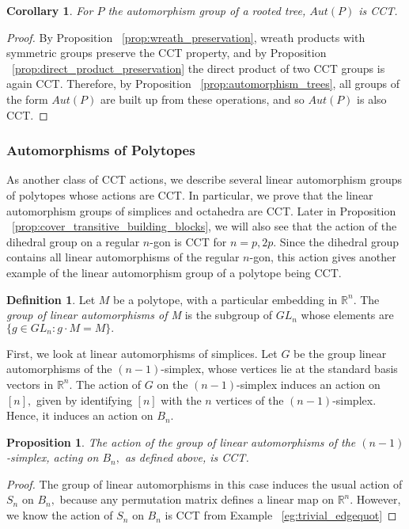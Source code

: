 \documentclass[10 pt]{amsart}
\theoremstyle{plain}
\newtheorem{prop}[thm]{Proposition}
\newtheorem{cor}[thm]{Corollary}
\theoremstyle{definition}
\newtheorem{defn}[thm]{Definition}
\theoremstyle{remark}
\numberwithin{equation}{section}
\newcommand\sssec{\subsubsection}
\begin{document}
\begin{cor}
\label{cor:tree_cct}
For $P$ the automorphism group of a rooted tree, $Aut(P)$ is CCT.
\end{cor}
\begin{proof}
By Proposition ~\ref{prop:wreath_preservation}, wreath products with symmetric groups preserve the CCT property, and by Proposition ~\ref{prop:direct_product_preservation} the direct product of two CCT groups is again CCT. Therefore, by Proposition ~\ref{prop:automorphism_trees}, all groups of the form $Aut(P)$ are built up from these operations, and so $Aut(P)$ is also CCT.
\end{proof}

\sssec{Automorphisms of Polytopes}
\label{sssec:polytopes}

As another class of CCT actions, we describe several linear automorphism groups of polytopes whose actions are CCT. In particular, we prove that the linear automorphism groups of simplices and octahedra are CCT.
Later in Proposition ~\ref{prop:cover_transitive_building_blocks}, we will also see that the action of the dihedral group on a regular $n$-gon is CCT for $n = p,2p$.  Since the dihedral group contains all linear automorphisms of the regular $n$-gon, this action gives another example of the linear automorphism group of a polytope being CCT.

\begin{defn}
Let $M$ be a polytope, with a particular embedding in $\mathbb R^n.$ The {\it group of linear automorphisms of M} is the subgroup of $GL_n$ whose elements are $\{g \in GL_n:g \cdot M = M\}.$
\end{defn}

First, we look at linear automorphisms of simplices. Let $G$ be the group linear automorphisms of the $(n-1)$-simplex, whose vertices lie at the standard basis vectors in $\mathbb R^n.$ The action of $G$ on the $(n-1)$-simplex induces an action on $[n],$ given by identifying $[n]$ with the $n$ vertices of the $(n-1)$-simplex. Hence, it induces an action on $B_n.$

\begin{prop}
The action of the group of linear automorphisms of the $(n-1)$-simplex, acting on $B_n,$ as defined above, is CCT.
\end{prop}
\begin{proof}
The group of linear automorphisms in this case induces the usual action of $S_n$ on $B_n,$ because any permutation matrix defines a linear map on $\mathbb R^n.$ However, we know the action of $S_n$ on $B_n$ is CCT from Example ~\ref{eg:trivial_edgequot}
\end{proof}
\end{document}
